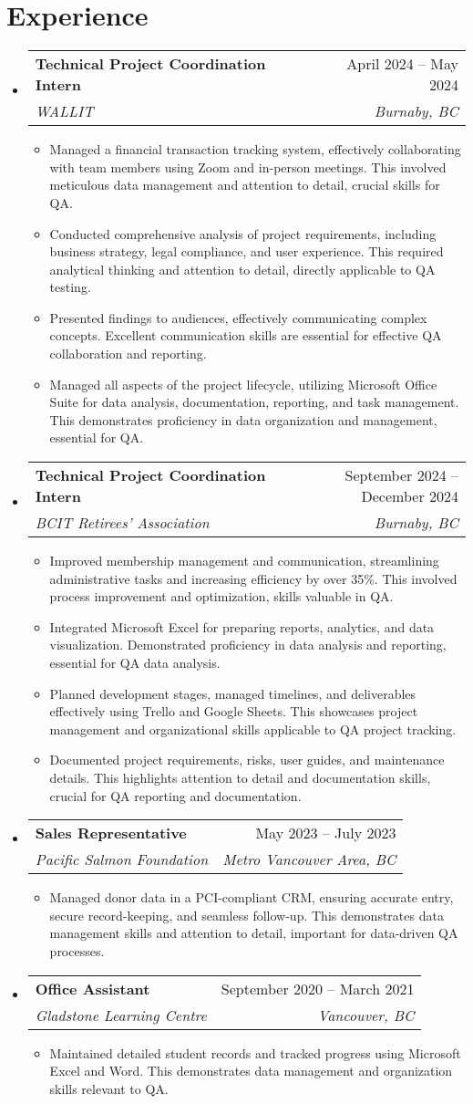 \documentclass[letterpaper,11pt]{article}
\makeatletter
\newcommand{\resumeItem}[1]{
\item\small{
{#1 \vspace{-2pt}}
}
}
\newcommand{\resumeSubheading}[4]{
\vspace{-2pt}\item
\begin{tabular*}{0.97\textwidth}[t]{l@{\extracolsep{\fill}}r}
\textbf{#1} & #2 \\
\textit{\small#3} & \textit{\small #4} \\
\end{tabular*}\vspace{-7pt}
}
\newcommand{\resumeSubHeadingListStart}{\begin{itemize}[leftmargin=0.15in, label={}]}
\newcommand{\resumeSubHeadingListEnd}{\end{itemize}}
\newcommand{\resumeItemListStart}{\begin{itemize}}
\newcommand{\resumeItemListEnd}{\end{itemize}\vspace{-5pt}}
\makeatother
\begin{document}
\section{Experience}
\resumeSubHeadingListStart
\resumeSubheading{Technical Project Coordination Intern}{April 2024 – May 2024}{WALLIT}{Burnaby, BC}
\resumeItemListStart
\resumeItem{Managed a financial transaction tracking system, effectively collaborating with team members using Zoom and in-person meetings.  This involved meticulous data management and attention to detail, crucial skills for QA.}
\resumeItem{Conducted comprehensive analysis of project requirements, including business strategy, legal compliance, and user experience. This required analytical thinking and attention to detail, directly applicable to QA testing.}
\resumeItem{Presented findings to audiences, effectively communicating complex concepts. Excellent communication skills are essential for effective QA collaboration and reporting.}
\resumeItem{Managed all aspects of the project lifecycle, utilizing Microsoft Office Suite for data analysis, documentation, reporting, and task management.  This demonstrates proficiency in data organization and management, essential for QA.}
\resumeItemListEnd
\resumeSubheading{Technical Project Coordination Intern}{September 2024 – December 2024}{BCIT Retirees' Association}{Burnaby, BC}
\resumeItemListStart
\resumeItem{Improved membership management and communication, streamlining administrative tasks and increasing efficiency by over 35\%. This involved process improvement and optimization, skills valuable in QA.}
\resumeItem{Integrated Microsoft Excel for preparing reports, analytics, and data visualization. Demonstrated proficiency in data analysis and reporting, essential for QA data analysis.}
\resumeItem{Planned development stages, managed timelines, and deliverables effectively using Trello and Google Sheets. This showcases project management and organizational skills applicable to QA project tracking.}
\resumeItem{Documented project requirements, risks, user guides, and maintenance details. This highlights attention to detail and documentation skills, crucial for QA reporting and documentation.}
\resumeItemListEnd
\resumeSubheading{Sales Representative}{May 2023 – July 2023}{Pacific Salmon Foundation}{Metro Vancouver Area, BC}
\resumeItemListStart
\resumeItem{Managed donor data in a PCI-compliant CRM, ensuring accurate entry, secure record-keeping, and seamless follow-up. This demonstrates data management skills and attention to detail, important for data-driven QA processes.}
\resumeItemListEnd
\resumeSubheading{Office Assistant}{September 2020 – March 2021}{Gladstone Learning Centre}{Vancouver, BC}
\resumeItemListStart
\resumeItem{Maintained detailed student records and tracked progress using Microsoft Excel and Word. This demonstrates data management and organization skills relevant to QA.}
\resumeItemListEnd
\resumeSubHeadingListEnd
\end{document}
